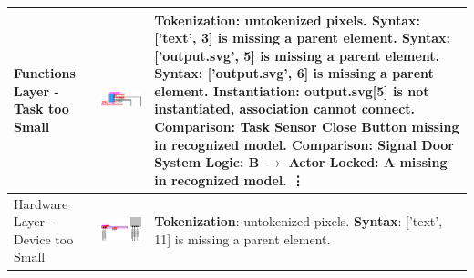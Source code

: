 \begin{longtable}{p{} >{\raggedright\arraybackslash}m{} >{\raggedright\arraybackslash}m{}}
    \bottomrule
    \endlastfoot
    Functions Layer - Task too Small &  \includegraphics[width=1\linewidth]{pictures/20_task_too_small_output_clip.png} & \textbf{Tokenization}: untokenized pixels. \newline
        \textbf{Syntax}: ['text', 3] is missing a parent element. \newline
        \textbf{Syntax}: ['output.svg', 5] is missing a parent element. \newline
        \textbf{Syntax}: ['output.svg', 6] is missing a parent element. \newline
        \textbf{Instantiation}: output.svg[5] is not instantiated, association cannot connect. \newline
        \textbf{Comparison}: Task Sensor Close Button missing in recognized model. \newline
        \textbf{Comparison}: Signal Door System Logic: B $\rightarrow$ Actor Locked: A missing in recognized model. \newline
        \vdots \\
    \midrule
    Hardware Layer - Device too Small &  \includegraphics[width=1\linewidth]{pictures/21_device_too_small_output_clip.png} & \textbf{Tokenization}: untokenized pixels. \newline
        \textbf{Syntax}: ['text', 11] is missing a parent element. \newline

\end{longtable}
